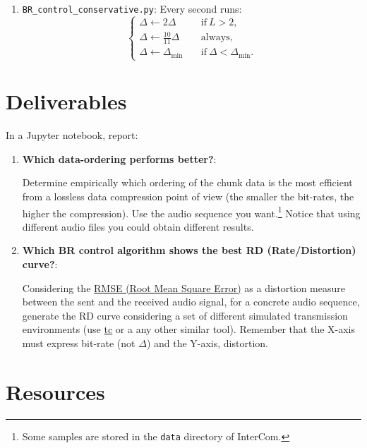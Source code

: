 \begin{enumerate}
\item \verb|BR_control_conservative.py|: Every second runs:
  \begin{equation}
    \left\{
    \begin{array}{ll}
      \Delta \leftarrow 2\Delta & \quad\text{if}~L>2, \\
      \Delta \leftarrow \frac{10}{11}\Delta & \quad\text{always}, \\
      \Delta \leftarrow \Delta_{\text{min}} & \quad\text{if}~\Delta < \Delta_{\text{min}}.
    \end{array}
    \right.
  \end{equation}
\end{enumerate}


\section{Deliverables}

In a Jupyter notebook, report:
\begin{enumerate}
\item \textbf{Which data-ordering performs better?}:
  
Determine empirically which ordering of the chunk data is the most
efficient from a lossless data compression point of view (the smaller
the bit-rates, the higher the compression). Use the audio sequence you
want.\footnote{Some samples are stored in the \texttt{data} directory of
  InterCom.} Notice that using different audio files you could obtain
different results.



\item \textbf{Which BR control algorithm shows the best RD (Rate/Distortion) curve?}:
  
  Considering the
  \href{https://en.wikipedia.org/wiki/Root-mean-square_deviation}{RMSE
    (Root Mean Square Error)} as a distortion measure between the sent
  and the received audio signal, for a concrete audio sequence,
  generate the RD curve considering a set of different simulated
  transmission environments (use
  \href{https://vicente-gonzalez-ruiz.github.io/about_tc/}{tc} or a
  any other similar tool). Remember that the X-axis must express
  bit-rate (not $\Delta$) and the Y-axis, distortion.

\end{enumerate}



\section{Resources}


